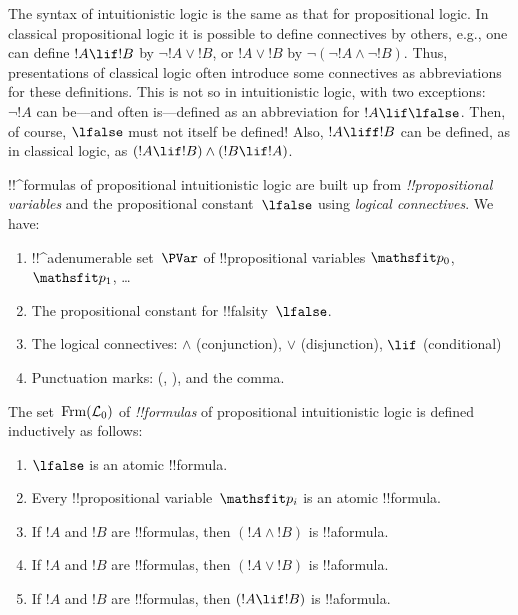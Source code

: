 \documentclass[../../../include/open-logic-section]{subfiles}
\begin{document}


The syntax of intuitionistic logic is the same as that for
propositional logic. In classical propositional logic it is possible
to define connectives by others, e.g., one can define $!A \lif !B$ by
$\lnot !A \lor !B$, or $!A \lor !B$ by $\lnot(\lnot !A \land \lnot
!B)$. Thus, presentations of classical logic often introduce some
connectives as abbreviations for these definitions. This is not so in
intuitionistic logic, with two exceptions: $\lnot !A$ can be---and
often is---defined as an abbreviation for $!A \lif \lfalse$. Then, of
course, $\lfalse$ must not itself be defined!{} Also, $!A \liff !B$
can be defined, as in classical logic, as $(!A \lif !B) \land (!B \lif
!A)$.

!!^{formula}s of propositional intuitionistic logic are built up from
\emph{!!{propositional variable}s} and the propositional
constant~$\lfalse$ using \emph{logical connectives}. We have:

\begin{enumerate}
\item !!^a{denumerable} set~$\PVar$ of !!{propositional variable}s $\Obj p_0$,
  $\Obj p_1$, \dots
  \item The propositional constant for !!{falsity}~$\lfalse$.
\item The logical connectives: $\land$
  (conjunction), $\lor$ (disjunction), $\lif$ (conditional)
\item Punctuation marks: (, ), and the comma.
\end{enumerate}

\begin{defn}[Formula]
 The set~$\Frm[L_0]$ of \emph{!!{formula}s} of
propositional intuitionistic logic is defined inductively as follows:
\begin{enumerate}
\item $\lfalse$ is an atomic !!{formula}.

\item Every !!{propositional variable}~$\Obj p_i$ is an atomic
  !!{formula}.

\item If $!A$ and $!B$ are !!{formula}s, then $(!A \land
  !B)$ is !!a{formula}.

\item If $!A$ and $!B$ are !!{formula}s, then $(!A \lor !B)$
  is !!a{formula}.

\item If $!A$ and $!B$ are !!{formula}s, then $(!A \lif !B)$
  is !!a{formula}.

\end{enumerate}
\end{defn}
\end{document}
